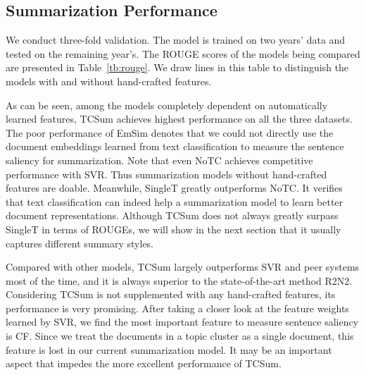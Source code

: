 \documentclass[letterpaper]{article}
\begin{document}
\subsection{Summarization Performance}
We conduct three-fold validation.
The model is trained on two years' data and tested on the remaining year's.
The ROUGE scores of the models being compared are presented in Table~\ref{tb:rouge}.
We draw lines in this table to distinguish the models with and without hand-crafted features.

As can be seen, among the models completely dependent on automatically learned features, TCSum achieves highest performance on all the three datasets.
The poor performance of EmSim denotes that we could not directly use the document embeddings learned from text classification to measure the sentence saliency for summarization.
Note that even NoTC achieves competitive performance with SVR.
Thus summarization models without hand-crafted features are doable.
Meanwhile, SingleT greatly outperforms NoTC.
It verifies that text classification can indeed help a summarization model to learn better document representations.
Although TCSum does not always greatly surpass SingleT in terms of ROUGEs, we will show in the next section that it usually captures different summary styles.

Compared with other models, TCSum largely outperforms SVR and peer systems most of the time, and it is always superior to the state-of-the-art method R2N2.
Considering TCSum is not supplemented with any hand-crafted features, its performance is very promising.
After taking a closer look at the feature weights learned by SVR, we find the most important feature to measure sentence saliency is CF.
Since we treat the documents in a topic cluster as a single document, this feature is lost in our current summarization model.
It may be an important aspect that impedes the more excellent performance of TCSum.
\end{document}
